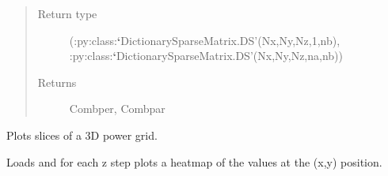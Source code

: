 \documentclass[letterpaper,10pt,english]{sphinxmanual}
\begin{document}
\begin{fulllineitems}
\begin{quote}
\begin{description}
\begin{itemize}
\end{itemize}

\item[{Return type}] \leavevmode
(:py:class:{\color{red}\bfseries{}{}`}DictionarySparseMatrix.DS'(Nx,Ny,Nz,1,nb),   :py:class:{\color{red}\bfseries{}{}`}DictionarySparseMatrix.DS'(Nx,Ny,Nz,na,nb))

\item[{Returns}] \leavevmode
Combper, Combpar

\end{description}\end{quote}

\end{fulllineitems}


\begin{fulllineitems}
\label{index:RayTracerMainProgram.plot_grid}
Plots slices of a 3D power grid.

Loads  and for each z step plots a heatmap of the   values at the (x,y) position.

\end{fulllineitems}

\end{document}
